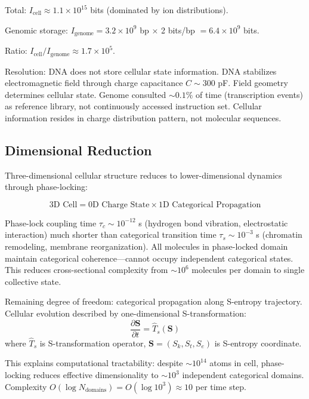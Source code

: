 \documentclass[11pt,a4paper]{article}
\theoremstyle{remark}
\newcommand{\Sk}{S_k}
\newcommand{\St}{S_t}
\newcommand{\Se}{S_e}
\newcommand{\Scoord}{\mathbf{S}}
\begin{document}
Total: $I_{\text{cell}} \approx 1.1 \times 10^{15}$ bits (dominated by ion distributions).

Genomic storage: $I_{\text{genome}} = 3.2 \times 10^9$ bp $\times$ 2 bits/bp $= 6.4 \times 10^9$ bits.

Ratio: $I_{\text{cell}}/I_{\text{genome}} \approx 1.7 \times 10^5$.

Resolution: DNA does not store cellular state information. DNA stabilizes electromagnetic field through charge capacitance $C \sim 300$ pF. Field geometry determines cellular state. Genome consulted $\sim 0.1\%$ of time (transcription events) as reference library, not continuously accessed instruction set. Cellular information resides in charge distribution pattern, not molecular sequences.

\subsection{Dimensional Reduction}

Three-dimensional cellular structure reduces to lower-dimensional dynamics through phase-locking:

\begin{equation}
\text{3D Cell} = \text{0D Charge State} \times \text{1D Categorical Propagation}
\end{equation}

Phase-lock coupling time $\tau_c \sim 10^{-12}$ s (hydrogen bond vibration, electrostatic interaction) much shorter than categorical transition time $\tau_s \sim 10^{-3}$ s (chromatin remodeling, membrane reorganization). All molecules in phase-locked domain maintain categorical coherence—cannot occupy independent categorical states. This reduces cross-sectional complexity from $\sim 10^6$ molecules per domain to single collective state.

Remaining degree of freedom: categorical propagation along S-entropy trajectory. Cellular evolution described by one-dimensional S-transformation:
\begin{equation}
\frac{\partial \Scoord}{\partial t} = \hat{T}_s(\Scoord)
\end{equation}
where $\hat{T}_s$ is S-transformation operator, $\Scoord = (\Sk, \St, \Se)$ is S-entropy coordinate.

This explains computational tractability: despite $\sim 10^{14}$ atoms in cell, phase-locking reduces effective dimensionality to $\sim 10^3$ independent categorical domains. Complexity $O(\log N_{\text{domains}}) = O(\log 10^3) \approx 10$ per time step.
\end{document}
